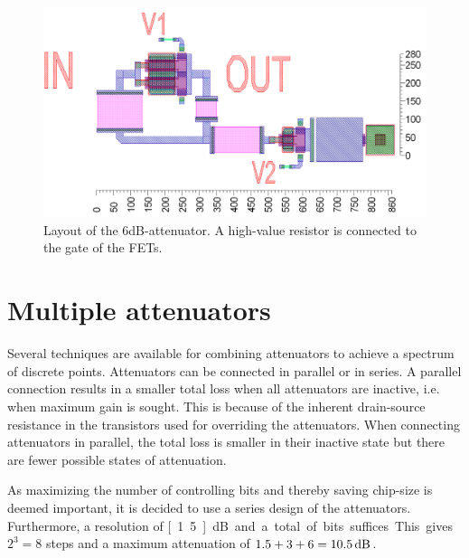 		\begin{figure}[h!]
			\centering
			\includegraphics[width=1.0\textwidth]{fig/attenuators/tee_att_layout_6dB}
			\caption[Layout of a tee-attenuator]{Layout of the 6dB-attenuator.  A high-value resistor is connected to the gate of the FETs.\scalemum}\label{fig:tee_att_layout}
		\end{figure}
		
		
			

	\section{Multiple attenuators}

		Several techniques are available for combining attenuators to achieve a spectrum of discrete points. Attenuators can be connected in parallel or in series. A parallel connection results in a smaller total loss when all attenuators are inactive, i.e. when maximum gain is sought. This is because of the inherent drain-source resistance in the transistors used for overriding the attenuators. When connecting attenuators in parallel, the total loss is smaller in their inactive state but there are fewer possible states of attenuation.

		As maximizing the number of controlling bits and thereby saving chip-size is deemed important, it is decided to use a series design of the attenuators. Furthermore, a resolution of \unit[1.5]{dB} and a total of \unit[3]{bits} suffices. This gives $2^3=8$ steps and a maximum attenuation of $1.5+3+6=\unit[10.5]{dB}$.

